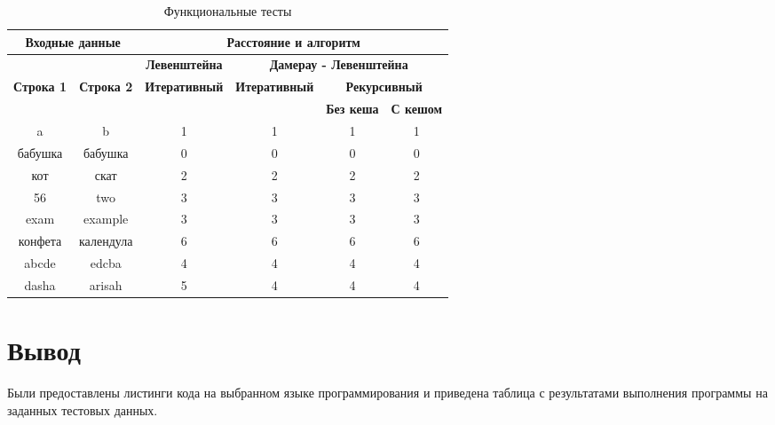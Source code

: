 \begin{table}[ht]
	\small
	\begin{center}
		\begin{threeparttable}
			\caption{Функциональные тесты}
			\label{tbl:func_tests}
			\begin{tabular}{|c|c|c|c|c|c|}
				\hline
				\multicolumn{2}{|c|}{\bfseries Входные данные}
				& \multicolumn{4}{c|}{\bfseries Расстояние и алгоритм} \\ 
				\hline 
				&
				& \multicolumn{1}{c|}{\bfseries Левенштейна} 
				& \multicolumn{3}{c|}{\bfseries Дамерау - Левенштейна} \\ \cline{3-6}
				
				\bfseries Строка 1 & \bfseries Строка 2 & \bfseries Итеративный & \bfseries Итеративный
				
				& \multicolumn{2}{c|}{\bfseries Рекурсивный} \\ \cline{5-6}
				& & & & \bfseries Без кеша & \bfseries С кешом \\
				\hline
				a & b & 1 & 1 & 1 & 1 \\
				\hline
				бабушка & бабушка & 0 & 0 & 0 & 0 \\
				\hline
				кот & скат & 2 & 2 & 2 & 2 \\
				\hline
				56 & two & 3 & 3 & 3 & 3 \\
				\hline
				exam & example & 3 & 3 & 3 & 3 \\
				\hline
				конфета & календула & 6 & 6 & 6 & 6 \\
				\hline
				abcde & edcba & 4 & 4 & 4 & 4 \\
				\hline
				dasha & arisah & 5 & 4 & 4 & 4 \\
				\hline
			\end{tabular}	
		\end{threeparttable}
	\end{center}
\end{table}


\section*{Вывод}

Были предоставлены листинги кода на выбранном языке программирования и приведена таблица с результатами выполнения программы на заданных тестовых данных.